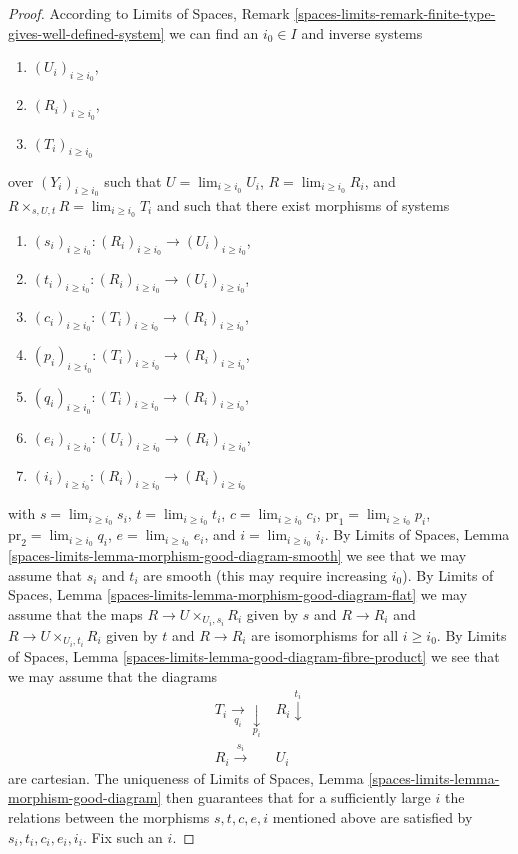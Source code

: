 \begin{proof}
\medskip\noindent
According to Limits of Spaces, Remark
\ref{spaces-limits-remark-finite-type-gives-well-defined-system}
we can find an $i_0 \in I$ and inverse systems
\begin{enumerate}
\item $(U_i)_{i \geq i_0}$,
\item $(R_i)_{i \geq i_0}$,
\item $(T_i)_{i \geq i_0}$
\end{enumerate}
over $(Y_i)_{i \geq i_0}$ such that
$U = \lim_{i \geq i_0} U_i$,
$R = \lim_{i \geq i_0} R_i$, and
$R \times_{s, U, t} R = \lim_{i \geq i_0} T_i$
and such that there exist morphisms of systems
\begin{enumerate}
\item $(s_i)_{i \geq i_0} : (R_i)_{i \geq i_0} \to (U_i)_{i \geq i_0}$,
\item $(t_i)_{i \geq i_0} : (R_i)_{i \geq i_0} \to (U_i)_{i \geq i_0}$,
\item $(c_i)_{i \geq i_0} : (T_i)_{i \geq i_0} \to (R_i)_{i \geq i_0}$,
\item $(p_i)_{i \geq i_0} : (T_i)_{i \geq i_0} \to (R_i)_{i \geq i_0}$,
\item $(q_i)_{i \geq i_0} : (T_i)_{i \geq i_0} \to (R_i)_{i \geq i_0}$,
\item $(e_i)_{i \geq i_0} : (U_i)_{i \geq i_0} \to (R_i)_{i \geq i_0}$,
\item $(i_i)_{i \geq i_0} : (R_i)_{i \geq i_0} \to (R_i)_{i \geq i_0}$
\end{enumerate}
with
$s = \lim_{i \geq i_0} s_i$,
$t = \lim_{i \geq i_0} t_i$,
$c = \lim_{i \geq i_0} c_i$,
$\text{pr}_1 = \lim_{i \geq i_0} p_i$,
$\text{pr}_2 = \lim_{i \geq i_0} q_i$,
$e = \lim_{i \geq i_0} e_i$, and
$i = \lim_{i \geq i_0} i_i$.
By Limits of Spaces, Lemma
\ref{spaces-limits-lemma-morphism-good-diagram-smooth}
we see that we may assume that $s_i$ and $t_i$ are smooth
(this may require increasing $i_0$).
By Limits of Spaces, Lemma
\ref{spaces-limits-lemma-morphism-good-diagram-flat}
we may assume that the maps
$R \to U \times_{U_i, s_i} R_i$ given by $s$ and $R \to R_i$ and
$R \to U \times_{U_i, t_i} R_i$ given by $t$ and $R \to R_i$
are isomorphisms for all $i \geq i_0$.
By Limits of Spaces, Lemma \ref{spaces-limits-lemma-good-diagram-fibre-product}
we see that we may assume that the diagrams
$$
\begin{array}{cc}T_i \underset{q_i}{\longrightarrow}\underset{p_i}{\downarrow} & R_i \overset{t_i}{\downarrow} \\ R_i \overset{s_i}{\longrightarrow} & U_i\end{array}
$$
are cartesian. The uniqueness of
Limits of Spaces, Lemma \ref{spaces-limits-lemma-morphism-good-diagram}
then guarantees that for a sufficiently large $i$
the relations between the morphisms $s, t, c, e, i$ mentioned above
are satisfied by $s_i, t_i, c_i, e_i, i_i$. Fix such an $i$.


\end{proof}
